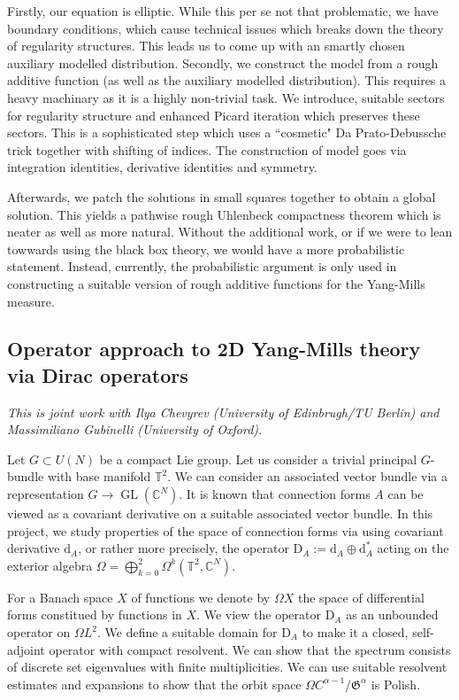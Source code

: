 \documentclass[11pt]{article}
\numberwithin{equation}{section}
\theoremstyle{definition}
\theoremstyle{remark}
\newcommand{\diff}{\mathrm{d}}
\newcommand{\1}{\mathbf 1}
\newcommand{\<}{\langle}
\renewcommand{\>}{\rangle}
\newcommand{\rmD}{\mathrm{D}}
\newcommand{\bT}{\mathbb T}
\begin{document}
Firstly, our equation is elliptic. While this per se not that problematic, we have boundary conditions, which cause technical issues which breaks down the theory of regularity structures. This leads us to come up with an smartly chosen auxiliary modelled distribution.  Secondly, we construct the model from a rough additive function (as well as the auxiliary modelled distribution). This requires a heavy machinary as it is a highly non-trivial task. We introduce, suitable sectors for regularity structure and enhanced Picard iteration which preserves these sectors. This is a sophisticated step which uses a ``cosmetic" Da Prato-Debussche trick together with shifting of indices.   The construction of model goes via integration identities, derivative identities and symmetry.  

Afterwards, we patch the solutions in small squares together to obtain a global solution. This yields a pathwise rough Uhlenbeck compactness theorem which is neater as well as more natural. Without the additional work, or if we were to lean towwards using the black box theory, we would have a more probabilistic statement. Instead, currently, the probabilistic argument  is only used in constructing a suitable version of rough additive functions for the Yang-Mills measure. 
%




\subsection{Operator approach to 2D Yang-Mills theory via Dirac operators}\label{sec:Dirac_2D}
%
\textit{This is joint work with Ilya Chevyrev (University of Edinbrugh/TU Berlin) and Massimiliano Gubinelli (University of Oxford).} 

\medskip 

\noindent Let $G\subset U(N)$ be a compact Lie group. Let us consider a trivial principal $G$-bundle with base manifold $\bT^2$. We can consider an associated vector bundle via a representation $G\to \operatorname{GL}(\mathbb C^N)$. It is known that connection forms $A$ can be viewed as a covariant derivative on a suitable associated vector bundle. In this project, we study properties of the space of connection forms via using covariant derivative $\diff_A$, or rather more precisely, the operator  $\mathrm{D}_A:=\diff_A\oplus\diff_A^*$ acting on the exterior algebra $\Omega=\bigoplus_{k=0}^ 2\Omega^k(\bT^2,\mathbb C^N)$. 

For a Banach space $X$ of functions we denote by $\Omega X$ the space of differential forms constitued by functions in $X$. We view the operator $\rmD_A$ as an unbounded operator on $\Omega L^2$. We define a suitable domain for $\rmD_A$ to make it a closed, self-adjoint operator with compact resolvent. We can show that the spectrum consists of discrete set eigenvalues with finite multiplicities. We can use suitable resolvent estimates and expansions to show that the orbit space $\Omega C^{\alpha-1}/\mathfrak G^\alpha$ is Polish.
\end{document}
